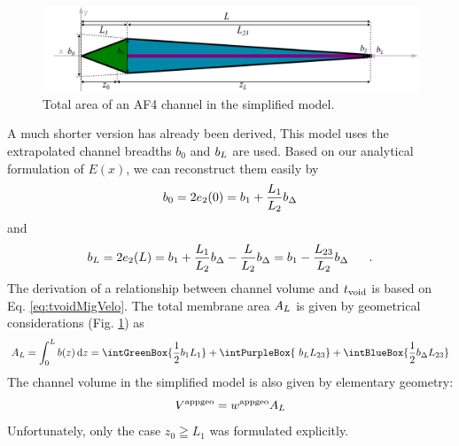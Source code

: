 \begin{figure}[H]
  \begin{center}
    \includegraphics[width=\linewidth]{./images/fffSimplified.pdf}
    \vspace*{-3ex}    
  \end{center}
  \caption[Total area of an AF4 channel in the simplified model]{
    Total area of an AF4 channel in the simplified model.}
  \label{fig:fffSimplified}
\end{figure}
A much shorter version has already been derived, %
This model uses the extrapolated channel breadths $b_0$ and $b_L$ are used. Based on our analytical formulation of 
$E(x)$, we can reconstruct them easily by
\begin{equation}
b_0 = 2e_2(0) = b_1+\frac{L_1}{L_2}b_\Delta 
\end{equation}
and
\begin{equation}
b_L = 2e_2(L) 
= b_1+\frac{L_1}{L_2}b_\Delta - \frac{L}{L_2}b_\Delta 
= b_1-\frac{L_{23}}{L_2}b_\Delta ~~~~~.
\end{equation}
The derivation of a relationship between channel volume and $t_\text{void}$ is based on Eq. \ref{eq:tvoidMigVelo}.
The total membrane area $A_L$ is given by geometrical considerations (Fig. \ref{fig:fffSimplified}) as 
\begin{equation}
\AL = \int_{0}^{L} b(z) \diff z 
= 
\intGreenBox{\ensuremath{\frac{1}{2} b_1 L_1}}
+ 
\intPurpleBox{ \ensuremath{ \phantom{ \frac{1}{2} } \hspace{-1ex} b_L L_{23}}  }
+
\intBlueBox{\ensuremath{\frac{1}{2} \bDelta L_{23}}}
\end{equation}
The channel volume in the simplified model is also given by elementary geometry:
\begin{equation}
V^{\text{appgeo}} = w^{\text{appgeo}} A_L
\end{equation}
Unfortunately, only the case $z_0 \geqq L_1$ was formulated explicitly.
